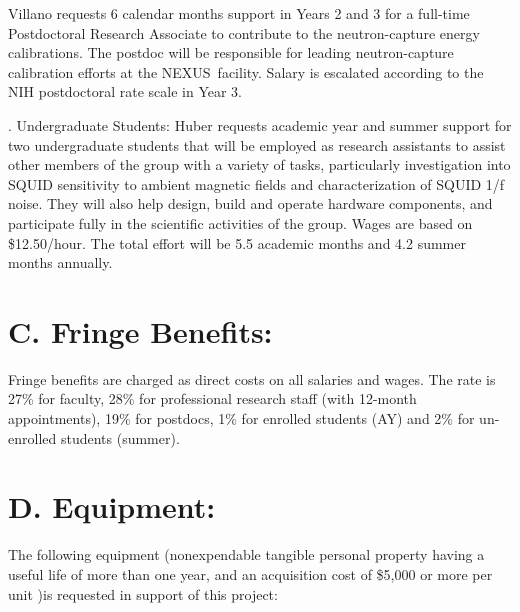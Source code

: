 \documentclass[11pt]{article}
\def\ni{\noindent}
\def\ss{\smallskip}
\newcommand{\NEXUS}{{\small NEXUS}}
\begin{document}
Villano requests 6 calendar months support in Years 2 and 3 for a full-time Postdoctoral Research Associate to contribute to the neutron-capture energy calibrations. The postdoc will be responsible for leading neutron-capture calibration efforts at the \NEXUS\ facility.  Salary is escalated according to the NIH postdoctoral rate scale in Year 3.


%
%
\ss \ni 3. Undergraduate Students: Huber requests academic year and summer support for two undergraduate students that will be employed as research assistants to assist other members of the group with a variety of tasks, particularly investigation into SQUID sensitivity to ambient magnetic fields and characterization of SQUID 1/f noise. They will also help design, build and operate hardware components, and participate fully in the scientific activities of the group. Wages are based on \$12.50/hour. The total effort will be 5.5 academic months and 4.2 summer months annually.


\section*{C. Fringe Benefits:} 

Fringe benefits are charged as direct costs on all salaries and wages. The rate is 27\% for faculty, 28\% for professional research staff (with 12-month appointments), 19\% for postdocs, 1\% for enrolled students (AY) and 2\% for un-enrolled students (summer).

\section*{D. Equipment:}
The following equipment (nonexpendable tangible personal property having a useful life of more than one year, and an acquisition cost of \$5,000 or more per unit )is requested in support of this project:
\end{document}
